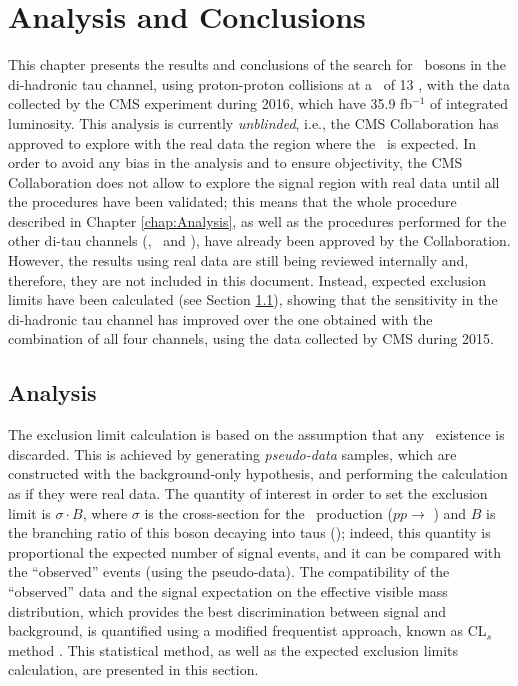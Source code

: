 
\chapter[Analysis and Conclusions]{Analysis and Conclusions}
\label{chap:Conclusions}

\noindent This chapter presents the results and conclusions of the search 
for \Zprime~bosons in the di-hadronic tau channel, using proton-proton 
collisions at a \centermassenergy~of 13 \TeV, with the data 
collected by the CMS experiment during 2016, which have 35.9 fb$^{-1}$ of 
integrated luminosity. This analysis is currently \textit{unblinded}, i.e., the
CMS Collaboration has approved to explore with the real data the region where 
the \Zprimetotautau~is expected. In order to avoid any bias 
in the analysis and to ensure objectivity, the CMS Collaboration 
does not allow to explore the signal region with real data until
all the procedures have been validated; this means that the whole 
procedure described in Chapter \ref{chap:Analysis}, as well as the procedures 
performed for the other di-tau channels (\tauh\taumu, \tauh\taue~and \taumu\taue), have already 
been approved by the Collaboration. However, the results using real data 
are still being reviewed internally and, therefore, they are 
not included in this document. Instead, expected exclusion 
limits have been calculated (see Section \ref{sec:Analysis}), showing that
the sensitivity in the di-hadronic tau channel has improved over the one 
obtained with the combination of all four channels, using the data 
collected by CMS during 2015. 

\section{Analysis}
\label{sec:Analysis}

\noindent The exclusion limit calculation is based on the assumption that any 
\Zprime~existence is discarded. This is achieved by generating 
\textit{pseudo-data} samples, which are constructed with the 
background-only hypothesis, and performing the calculation as 
if they were real data. The quantity of interest in order to set 
the exclusion limit is $\sigma \cdot B$, where $\sigma$ is 
the cross-section for the \Zprime~production ($pp \rightarrow$ \Zprime) 
and $B$ is the branching ratio of this boson decaying into taus (\Zprimetotautau);
indeed, this quantity is proportional the expected number of signal events, and it can 
be compared with the ``observed'' events (using the pseudo-data). The compatibility
of the ``observed'' data and the signal expectation on the effective visible mass
distribution, which provides the best discrimination between signal and background,
is quantified using a modified frequentist approach, known as CL$_{s}$ method \cite{CLs1Cowan,CLs2}. This 
statistical method, as well as the expected exclusion 
limits calculation, are presented in this section. 

